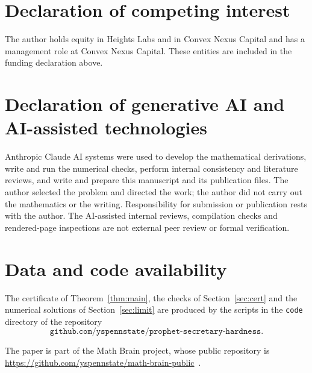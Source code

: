 \documentclass[11pt]{amsart}
\theoremstyle{remark}\newtheorem{remark}[theorem]{Remark}
\begin{document}
\section*{Declaration of competing interest}

The author holds equity in Heights Labs and in Convex Nexus Capital and has a management role at Convex Nexus Capital. These entities are included in the funding declaration above.

\section*{Declaration of generative AI and AI-assisted technologies}

Anthropic Claude AI systems were used to develop the mathematical derivations, write and run the numerical checks, perform internal consistency and literature reviews, and write and prepare this manuscript and its publication files. The author selected the problem and directed the work; the author did not carry out the mathematics or the writing. Responsibility for submission or publication rests with the author. The AI-assisted internal reviews, compilation checks and rendered-page inspections are not external peer review or formal verification.

\section*{Data and code availability}

The certificate of Theorem~\ref{thm:main}, the checks of Section~\ref{sec:cert} and the numerical solutions of
Section~\ref{sec:limit} are produced by the scripts in the \texttt{code} directory of the repository
\[
\texttt{github.com/yspennstate/prophet-secretary-hardness}.
\]

The paper is part of the Math Brain project, whose public repository is \url{https://github.com/yspennstate/math-brain-public}~\cite{MathBrainRepo}.
\end{document}
